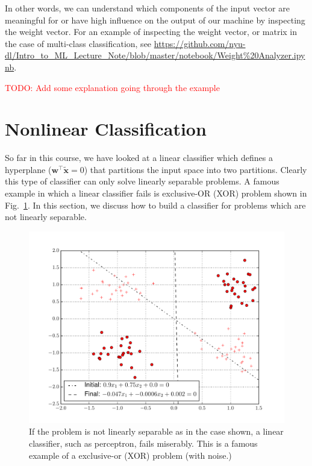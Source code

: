\documentclass{report}
\newcommand{\vect}[1]{\mathbf{#1}}
\newcommand{\vx}[0]{\vect{x}}
\newcommand{\vw}[0]{\vect{w}}
\newcommand{\alert}[1]{\textcolor{red}{#1}}
\begin{document}
In other words, we can understand which components of the input vector are
meaningful for or have high influence on the output of our machine by inspecting
the weight vector. For an example of inspecting the weight vector, or matrix in
the case of multi-class classification, see
\url{https://github.com/nyu-dl/Intro_to_ML_Lecture_Note/blob/master/notebook/Weight%20Analyzer.ipynb}.

\alert{TODO: Add some explanation going through the example}


\section{Nonlinear Classification}

So far in this course, we have looked at a linear classifier which defines a
hyperplane ($\vw^\top \tilde{\vx} = 0$) that partitions the input space into two
partitions. Clearly this type of classifier can only solve linearly separable
problems. A famous example in which a linear classifier fails is exclusive-OR
(XOR) problem shown in Fig.~\ref{fig:perceptron_xor}. In this section, we
discuss how to build a classifier for problems which are not linearly separable.

\begin{figure}
    \centering
    \begin{minipage}{0.6\textwidth}
        \centering
        \includegraphics[width=\columnwidth]{figures/perceptron_failure.pdf}
    \end{minipage}
    \begin{minipage}{0.39\textwidth}
        \caption{
            \label{fig:perceptron_xor}
            If the problem is not linearly separable as in the case shown, a
            linear classifier, such as perceptron, fails miserably. This is a
            famous example of a exclusive-or (XOR) problem (with noise.)
        }
    \end{minipage}
\end{figure}
\end{document}
